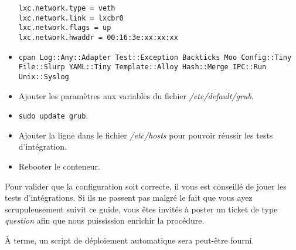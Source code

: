 \begin{itemize}
		{\tt{}lxc.network.type = veth\\
lxc.network.link = lxcbr0\\
lxc.network.flags = up\\
lxc.network.hwaddr = 00:16:3e:xx:xx:xx}
	\item {\tt cpan Log::Any::Adapter Test::Exception Backticks Moo Config::Tiny File::Slurp YAML::Tiny Template::Alloy Hash::Merge IPC::Run Unix::Syslog}
	\item Ajouter les paramètres  aux variables  du fichier \emph{/etc/default/grub}.
	\item {\tt sudo update grub}.
	\item Ajouter la ligne  dans le fichier \emph{/etc/hosts} pour pouvoir réussir les tests d'intégration.
	\item Rebooter le conteneur.
\end{itemize}

Pour valider que la configuration soit correcte, il vous est conseillé de jouer les tests d'intégrations.
Si ils ne passent pas malgré le fait que vous ayez scrupuleusement suivit ce guide, vous êtes invités à poster un ticket de type \emph{question} afin que nous puissission enrichir la procédure.

À terme, un script de déploiement automatique sera peut-être fourni.


